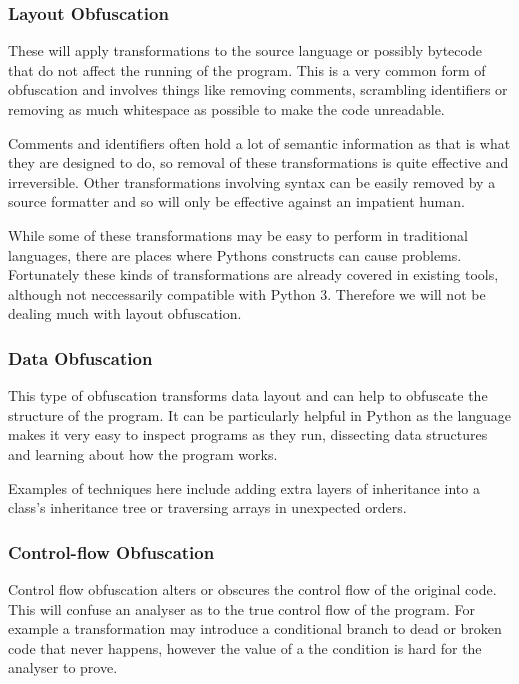 \documentclass{report}
\begin{document}
\subsubsection{Layout Obfuscation}

These will apply transformations to the source language or possibly bytecode that do not affect the running of the
program. This is a very common form of obfuscation \cite[p10]{desevobf} and involves things like removing comments,
scrambling identifiers or removing as much whitespace as possible to make the code unreadable.

Comments and identifiers often hold a lot of semantic information as that is what they are designed to do, so
removal of these transformations is quite effective and irreversible. Other transformations involving syntax
can be easily removed by a source formatter and so will only be effective against an impatient human.

While some of these transformations may be easy to perform in traditional languages, there are places where
Pythons constructs can cause problems. Fortunately these kinds of transformations are already covered in existing
tools, although not neccessarily compatible with Python 3. Therefore we will not be dealing much with layout obfuscation.

\subsubsection{Data Obfuscation}

This type of obfuscation transforms data layout and can help to obfuscate the structure of the program. It can be
particularly helpful in Python as the language makes it very easy to inspect programs as they run, dissecting data
structures and learning about how the program works.

Examples of techniques here include adding extra layers of inheritance into a class's inheritance tree or traversing arrays
in unexpected orders.

\subsubsection{Control-flow Obfuscation}

Control flow obfuscation alters or obscures the control flow of the original code. This will confuse an analyser as to the
true control flow of the program. For example a transformation may introduce a conditional branch to dead or broken code
that never happens, however the value of a the condition is hard for the analyser to prove.
\end{document}
